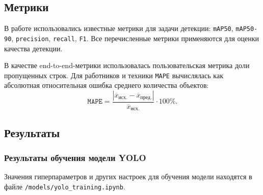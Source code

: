 
\subsection{Метрики}

В работе использовались известные метрики для задачи детекции: \texttt{mAP50}, \texttt{mAP50-90},
\texttt{precision}, \texttt{recall}, \texttt{F1}. Все перечисленные метрики применяются для оценки качества детекции.

В качестве end-to-end-метрики использовалась пользовательская метрика доли пропущенных строк.
Для работников и техники \texttt{MAPE} вычислялась как абсолютная относительная ошибка среднего количества объектов:
\[
    \texttt{MAPE} =
    \frac{\left|\overline{x}_{\text{исх.}} - \overline{x}_{\text{пред.}}\right|}
    {\overline{x}_{\text{исх.}}} \cdot 100\%.
\]



\subsection{Результаты}
\label{subsec:experiment-results}

\subsubsection{Результаты обучения модели YOLO}
\label{subsubsec:yolo-training-results}

Значения гиперпараметров и других настроек для обучения модели находятся в файле
\texttt{/models/yolo\_training.ipynb}.

